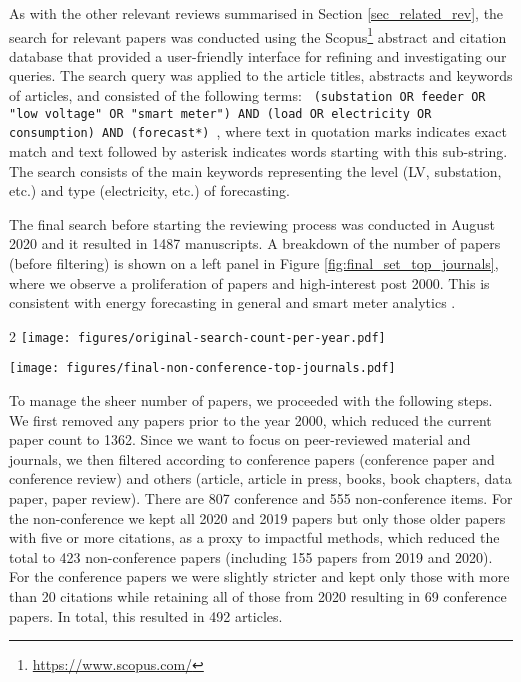 As with the other relevant reviews summarised in Section \ref{sec_related_rev}, the search for relevant papers was conducted using the Scopus\footnote{\url{https://www.scopus.com/}} abstract and citation database that provided a user-friendly interface for refining and investigating our queries. The search query was applied to the article titles, abstracts and keywords of articles, and consisted of the following terms:
%
\newline
\texttt{
	(substation OR feeder OR "low voltage" OR "smart meter") AND (load OR electricity OR consumption) AND (forecast*)
},
%
\newline
where text in quotation marks indicates exact match and text followed by asterisk indicates words starting with this sub-string.
The search consists of the main keywords representing the level (LV, substation, etc.) and type (electricity, etc.) of forecasting. 

The final search before starting the reviewing process was conducted in August 2020 and it resulted in 1487 manuscripts. A breakdown of the number of papers (before filtering) is shown on a left panel in Figure \ref{fig:final_set_top_journals}, where we observe a proliferation of papers and high-interest post 2000. This is consistent with energy forecasting in general \cite{Tao2020efa} and smart meter analytics \cite{Wang2018ros}.
\begin{figure*}
	\begin{multicols}{2}
		\texttt{[image: figures/original-search-count-per-year.pdf]}\par 
		\texttt{[image: figures/final-non-conference-top-journals.pdf]}\par 
	\end{multicols}
	\caption{Publication count per year using the search terms as given in the text is shown on the left. On the right are top journals from the final set of articles. Open-access journals are depicted with a light grey colour}
	\label{fig:final_set_top_journals}
\end{figure*}

To manage the sheer number of papers, we proceeded with the following steps. We first removed any papers prior to the year 2000, which reduced the current paper count to 1362. Since we want to focus on peer-reviewed material and journals, we then filtered according to conference papers (conference paper and conference review) and others (article, article in press, books, book chapters, data paper, paper review). There are 807 conference and 555 non-conference items. For the non-conference we kept all 2020 and 2019 papers but only those older papers with five or more citations, as a proxy to impactful methods, which reduced the total to 423 non-conference papers (including 155 papers from 2019 and 2020). For the conference papers we were slightly stricter and kept only those with more than 20 citations while retaining all of those from 2020 resulting in 69 conference papers. In total, this resulted in 492 articles. 

